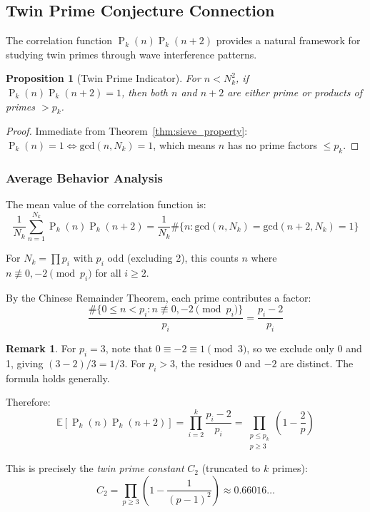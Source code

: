 ﻿\documentclass[12pt,a4paper]{report}
\theoremstyle{plain}
\newtheorem{proposition}[theorem]{Proposition}
\theoremstyle{definition}
\newtheorem{remark}[theorem]{Remark}
\renewcommand{\gcd}{\text{gcd}}
\DeclareMathOperator{\Pk}{P}
\begin{document}
\subsection{Twin Prime Conjecture Connection}
\label{sec:twin_primes}

The correlation function $\Pk_k(n)\Pk_k(n+2)$ provides a natural framework for studying twin primes through wave interference patterns.

\begin{proposition}[Twin Prime Indicator]
\label{prop:twin_indicator}
For $n < N_k^2$, if $\Pk_k(n)\Pk_k(n+2) = 1$, then both $n$ and $n+2$ are either prime or products of primes $> p_k$.
\end{proposition}

\begin{proof}
Immediate from Theorem~\ref{thm:sieve_property}: $\Pk_k(n) = 1 \iff \gcd(n, N_k) = 1$, which means $n$ has no prime factors $\leq p_k$.
\end{proof}

\subsubsection*{Average Behavior Analysis}

The mean value of the correlation function is:
\[
\frac{1}{N_k}\sum_{n=1}^{N_k} \Pk_k(n)\Pk_k(n+2) = \frac{1}{N_k}\#\{n : \gcd(n,N_k)=\gcd(n+2,N_k)=1\}
\]

For $N_k = \prod p_i$ with $p_i$ odd (excluding 2), this counts $n$ where $n \not\equiv 0, -2 \pmod{p_i}$ for all $i \geq 2$.

By the Chinese Remainder Theorem, each prime contributes a factor:
\[
\frac{\#\{0 \leq n < p_i : n \not\equiv 0, -2 \pmod{p_i}\}}{p_i} = \frac{p_i - 2}{p_i}
\]

\begin{remark}
For $p_i = 3$, note that $0 \equiv -2 \equiv 1 \pmod{3}$, so we exclude only 0 and 1, giving $(3-2)/3 = 1/3$. For $p_i > 3$, the residues 0 and $-2$ are distinct. The formula holds generally.
\end{remark}

Therefore:
\[
\mathbb{E}[\Pk_k(n)\Pk_k(n+2)] = \prod_{i=2}^k \frac{p_i - 2}{p_i} = \prod_{\substack{p \leq p_k \\ p \geq 3}} \left(1 - \frac{2}{p}\right)
\]

This is precisely the \emph{twin prime constant} $C_2$ (truncated to $k$ primes):
\[
C_2 = \prod_{p \geq 3} \left(1 - \frac{1}{(p-1)^2}\right) \approx 0.66016\ldots
\]
\end{document}
